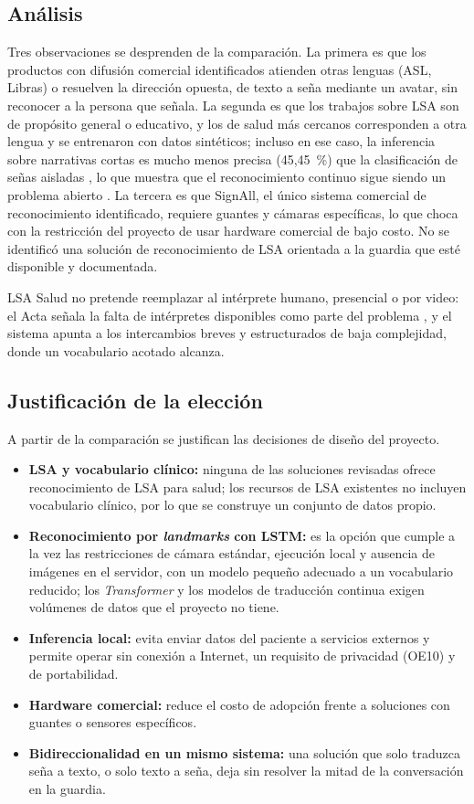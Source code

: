 \subsection{Análisis}

Tres observaciones se desprenden de la comparación. La primera es que los productos con difusión comercial identificados atienden otras lenguas (ASL, Libras) o resuelven la dirección opuesta, de texto a seña mediante un avatar, sin reconocer a la persona que señala. La segunda es que los trabajos sobre LSA son de propósito general o educativo, y los de salud más cercanos corresponden a otra lengua y se entrenaron con datos sintéticos; incluso en ese caso, la inferencia sobre narrativas cortas es mucho menos precisa (45,45~\%) que la clasificación de señas aisladas \parencite{becerril2025msl}, lo que muestra que el reconocimiento continuo sigue siendo un problema abierto \parencite{koller2020survey}. La tercera es que SignAll, el único sistema comercial de reconocimiento identificado, requiere guantes y cámaras específicas, lo que choca con la restricción del proyecto de usar hardware comercial de bajo costo. No se identificó una solución de reconocimiento de LSA orientada a la guardia que esté disponible y documentada.

LSA Salud no pretende reemplazar al intérprete humano, presencial o por video: el Acta señala la falta de intérpretes disponibles como parte del problema \parencite{actaconstitucion2026}, y el sistema apunta a los intercambios breves y estructurados de baja complejidad, donde un vocabulario acotado alcanza.

\subsection{Justificación de la elección}

A partir de la comparación se justifican las decisiones de diseño del proyecto.
\begin{itemize}
  \item \textbf{LSA y vocabulario clínico:} ninguna de las soluciones revisadas ofrece reconocimiento de LSA para salud; los recursos de LSA existentes no incluyen vocabulario clínico, por lo que se construye un conjunto de datos propio.
  \item \textbf{Reconocimiento por \emph{landmarks} con LSTM:} es la opción que cumple a la vez las restricciones de cámara estándar, ejecución local y ausencia de imágenes en el servidor, con un modelo pequeño adecuado a un vocabulario reducido; los \emph{Transformer} y los modelos de traducción continua exigen volúmenes de datos que el proyecto no tiene.
  \item \textbf{Inferencia local:} evita enviar datos del paciente a servicios externos y permite operar sin conexión a Internet, un requisito de privacidad (OE10) y de portabilidad.
  \item \textbf{Hardware comercial:} reduce el costo de adopción frente a soluciones con guantes o sensores específicos.
  \item \textbf{Bidireccionalidad en un mismo sistema:} una solución que solo traduzca seña a texto, o solo texto a seña, deja sin resolver la mitad de la conversación en la guardia.
\end{itemize}
